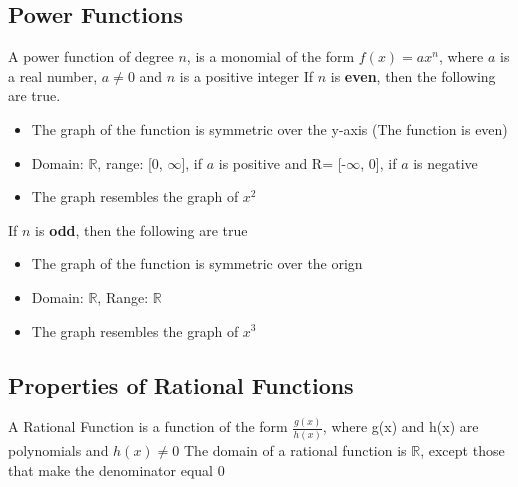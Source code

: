 \documentclass{report}
\begin{document}
    \subsection{Power Functions}
    A power function of degree $n $, is a monomial of the form $f(x) = ax^{n}$, where $a $ is a real number, $a \neq 0 $ and $n$ is a positive integer
    \bigbreak \noindent 
    If $n$ is \textbf{even}, then the following are true.
    \begin{itemize}
      \item The graph of the function is symmetric over the y-axis (The function is even)
      \item Domain: $ \mathbb{R}$, range: [0, $\infty$], if $a$ is positive and R= [-$\infty$, 0], if $a $ is negative
      \item The graph resembles the graph of $x^{2} $
    \end{itemize}
    \bigbreak \noindent 
    If $n $ is \textbf{odd}, then the following are true
    \begin{itemize}
      \item The graph of the function is symmetric over the orign
      \item Domain: $ \mathbb{R} $, Range: $ \mathbb{R} $
      \item The graph resembles the graph of $x^{3}$
    \end{itemize}

    \bigbreak \noindent \bigbreak \noindent 
    \subsection{Properties of Rational Functions}
    A Rational Function is a function of the form $\frac{g(x)}{h(x)}$, where g(x) and h(x) are polynomials and $h(x) \neq 0$
    \bigbreak \noindent 
    The domain of a rational function is $ \mathbb{R}$, except those that make the denominator equal 0
\end{document}
